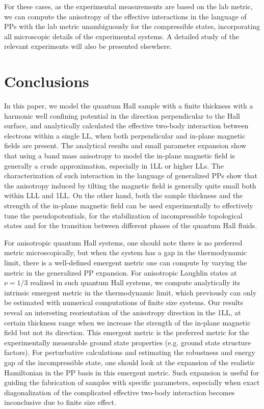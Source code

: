\documentclass[twocolumn,showpacs,amsmath,amstex,amssymb,mathfonts,prb]{revtex4-1}
\begin{document}
For these cases, as the experimental measurements are based on the lab metric, we can compute the anisotropy of the effective interactions in the language of PPs with the lab metric unambiguously for the compressible states, incorporating all microscopic details of the experimental systems. A detailed study of the relevant experiments will also be presented elsewhere.

\section{Conclusions}\label{summary}

In this paper, we model the quantum Hall sample with a finite thickness with a harmonic well confining potential in the direction perpendicular to the Hall surface, and analytically calculated the effective two-body interaction between electrons within a single LL, when both perpendicular and in-plane magnetic fields are present. The analytical results and small parameter expansion show that using a band mass anisotropy to model the in-plane magnetic field is generally a crude approximation, especially in 1LL or higher LLs. The characterization of such interaction in the language of generalized PPs show that the anisotropy induced by tilting the magnetic field is generally quite small both within LLL and 1LL. On the other hand, both the sample thickness and the strength of the in-plane magnetic field can be used experimentally to effectively tune the pseudopotentials, for the stabilization of incompressible topological states and for the transition between different phases of the quantum Hall fluids. 

For anisotropic quantum Hall systems, one should note there is no preferred metric microscopically, but when the system has a gap in the thermodynamic limit, there is a well-defined emergent metric one can compute by varying the metric in the generalized PP expansion. For anisotropic Laughlin states at $\nu=1/3$ realized in such quantum Hall systems, we compute analytically its intrinsic emergent metric in the thermodynamic limit, which previously can only be estimated with numerical computations of finite size systems. Our results reveal an interesting reorientation of the anisotropy direction in the 1LL, at certain thickness range when we increase the strength of the in-plane magnetic field but not its direction.  This emergent metric is the preferred metric for the experimentally measurable ground state properties (e.g. ground state structure factors). For perturbative calculations and estimating the robustness and energy gap of the incompressible state, one should look at the expansion of the realistic Hamiltonian in the PP basis in this emergent metric. Such expansion is useful for guiding the fabrication of samples with specific parameters, especially when exact diagonalization of the complicated effective two-body interaction becomes inconclusive due to finite size effect.
\end{document}
